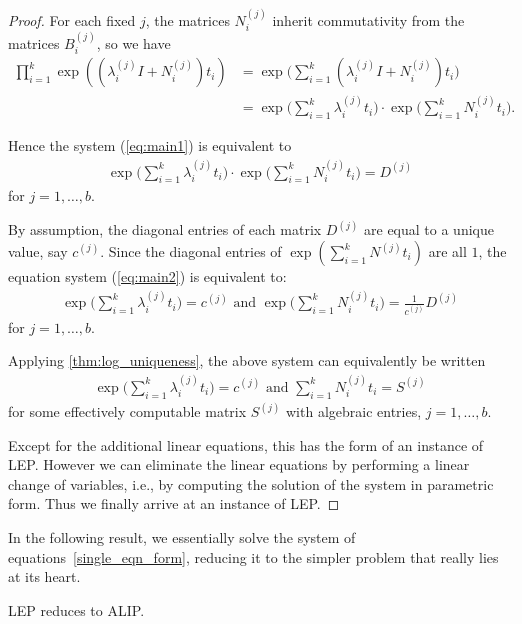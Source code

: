 \begin{proof}
For each fixed $j$, the matrices $N_{i}^{(j)}$ inherit commutativity from
the matrices $B^{(j)}_{i}$, so we have
\begin{align*}
\prod\limits_{i=1}^{k} \exp((\lambda_i^{(j)}I + N_i^{(j)})t_{i}) &=
   \exp\big(\sum_{i=1}^{k} (\lambda_i^{(j)}I  +
 N_i^{(j)}) t_i \big)\\
&= \exp\big(\sum_{i=1}^{k} \lambda_i^{(j)} t_i\big) \cdot
   \exp\big(\sum_{i=1}^{k} N_i^{(j)} t_i \big) .
\end{align*}

Hence the system (\ref{eq:main1}) is equivalent to
\begin{align}
\exp\big(\sum_{i=1}^{k} \lambda_i^{(j)} t_i\big) \cdot
   \exp\big(\sum_{i=1}^{k} N_i^{(j)} t_i \big)  = D^{(j)}
\label{eq:main2}
\end{align}
for $j=1,\ldots,b$.

By assumption, the diagonal entries of each matrix $D^{(j)}$ are
equal to a unique value, say $c^{(j)}$.
Since the diagonal entries of
$\exp\left(\sum_{i=1}^{k} N^{(j)}t_i\right)$
are all $1$, the equation system (\ref{eq:main2}) is equivalent to:
\begin{align*}
\exp\big(\sum_{i=1}^{k} \lambda_i^{(j)} t_i\big)
= c^{(j)} \mbox{ and }\exp\big(\sum_{i=1}^{k} N_i^{(j)} t_i \big)
=\frac{1}{c^{(j)}} D^{(j)}
\end{align*}
for $j=1,\ldots,b$.

Applying \cref{thm:log_uniqueness}, the
above system can equivalently be written
\begin{align*}
\exp\big(\sum_{i=1}^{k} \lambda_i^{(j)} t_i\big)
= c^{(j)} \mbox{ and } \sum_{i=1}^{k}
N_i^{(j)} t_i =
S^{(j)}
\end{align*}
for  some effectively computable matrix
$S^{(j)}$ with algebraic entries, $j=1,\ldots,b$.

Except for the additional linear equations, this has the form of an
instance of LEP\@.
 However we can eliminate the linear equations by
performing a linear change of variables, i.e., by computing the
solution of the system in parametric form.  Thus we finally arrive at
an instance of LEP\@.
\end{proof}


In the following result, we essentially solve the system of equations~\eqref{single_eqn_form}, reducing it to the simpler problem that really lies at its heart.

\begin{theorem}
\label{reference-for-log}
LEP reduces to ALIP\@.
\end{theorem}

